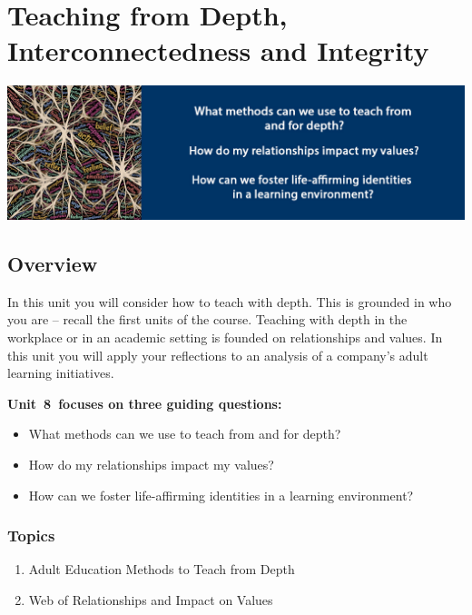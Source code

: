 \documentclass[
]{book}
\providecommand{\tightlist}{%
  \setlength{\itemsep}{0pt}\setlength{\parskip}{0pt}}
\begin{document}
\hypertarget{teaching-from-depth-interconnectedness-and-integrity}{%
\chapter{Teaching from Depth, Interconnectedness and Integrity}\label{teaching-from-depth-interconnectedness-and-integrity}}

\includegraphics{assets/unit8/BannerUnit8.jpg}

\hypertarget{overview-7}{%
\section*{Overview}\label{overview-7}}

In this unit you will consider how to teach with depth. This is grounded in who you are -- recall the first units of the course. Teaching with depth in the workplace or in an academic setting is founded on relationships and values. In this unit you will apply your reflections to an analysis of a company's adult learning initiatives.

\textbf{Unit~8~focuses on three guiding questions:}

\begin{itemize}
\tightlist
\item
  What methods can we use to teach from and for depth?\\
\item
  How do my relationships impact my values?\\
\item
  How can we foster life-affirming identities in a learning environment?
\end{itemize}

\hypertarget{topics-7}{%
\subsection*{Topics}\label{topics-7}}

\begin{enumerate}
\def\labelenumi{\arabic{enumi}.}
\tightlist
\item
  Adult Education Methods to Teach from Depth\\
\item
  Web of Relationships and Impact on Values
\end{enumerate}
\end{document}
